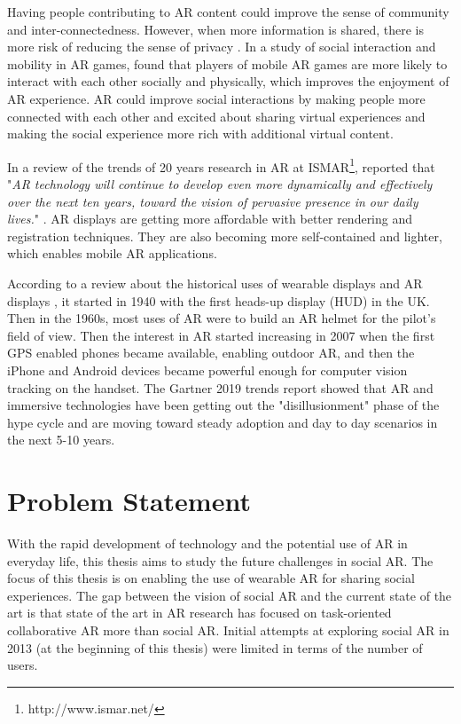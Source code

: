 Having people contributing to AR content could improve the sense of community and inter-connectedness. However, when more information is shared, there is more risk of reducing the sense of privacy \cite{Olsson2013}. In a study of social interaction and mobility in AR games, \textcite{Schmalstieg_144} found that players of mobile AR games are more likely to interact with each other socially and physically, which improves the enjoyment of AR experience. AR could improve social interactions by making people more connected with each other and excited about sharing virtual experiences and making the social experience more rich with additional virtual content. 

In a review of the trends of 20 years research in AR at ISMAR\footnote{http://www.ismar.net/}, \textcite{Zhou2008, Kim2018} reported that "\textit{AR technology will continue to develop even more dynamically and effectively over the next ten years, toward the vision of pervasive presence in our daily lives.}" \cite{Kim2018}. AR displays are getting more affordable with better rendering and registration techniques. They are also becoming more self-contained and lighter, which enables mobile AR applications.

According to a review about the historical uses of wearable displays and AR displays \cite{Peddie2017}, it started in 1940 with the first heads-up display (HUD) in the UK. Then in the 1960s, most uses of AR were to build an AR helmet for the pilot's field of view. Then the interest in AR started increasing in 2007 when the first GPS enabled phones became available, enabling outdoor AR, and then the iPhone and Android devices became powerful enough for computer vision tracking on the handset. 
The Gartner 2019 trends report \cite{gartner2019} showed that AR and immersive technologies have been getting out the "disillusionment" phase of the hype cycle and are moving toward steady adoption and day to day scenarios in the next 5-10 years.

\section{Problem Statement}

With the rapid development of technology and the potential use of AR in everyday life, this thesis aims to study the future challenges in social AR. The focus of this thesis is on enabling the use of wearable AR for sharing social experiences. The gap between the vision of social AR and the current state of the art is that state of the art in AR research has focused on task-oriented collaborative AR more than social AR. Initial attempts at exploring social AR in 2013 (at the beginning of this thesis) were limited in terms of the number of users. 


